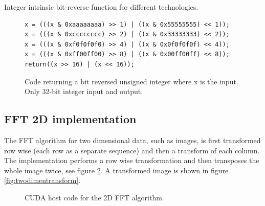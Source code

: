 \begin{table}[h!]
	\centering
	
	\caption{Integer intrinsic bit-reverse function for different technologies.}
	\label{tab:bit-reverse-intrinsics}
\end{table}

\begin{figure}[h]
	\centering
	\lstset{language=C++}
	\begin{framed}
	\begin{lstlisting}
x = (((x & 0xaaaaaaaa) >> 1) | ((x & 0x55555555) << 1));
x = (((x & 0xcccccccc) >> 2) | ((x & 0x33333333) << 2));
x = (((x & 0xf0f0f0f0) >> 4) | ((x & 0x0f0f0f0f) << 4));
x = (((x & 0xff00ff00) >> 8) | ((x & 0x00ff00ff) << 8));
return((x >> 16) | (x << 16));
	\end{lstlisting}
	\end{framed}
	\caption{ Code returning a bit reversed unsigned integer where x is the input. Only 32-bit integer input and output. }
	\label{fig:code-bit-reverse}
\end{figure}

\subsection{FFT 2D implementation}

The FFT algorithm for two dimensional data, such as images, is first transformed row wise (each row as a separate sequence) and then a transform of each column. The implementation performs a row wise transformation and then transposes the whole image twice, see figure \ref{lst:cuda:host-2d-example}. A transformed image is shown in figure \ref{fig:twodimentransform}.

\begin{figure}[h!]
	\centering
	\begin{framed}
			
	\end{framed}
	\caption{CUDA host code for the 2D FFT algorithm.}
	\label{lst:cuda:host-2d-example}	
\end{figure}


